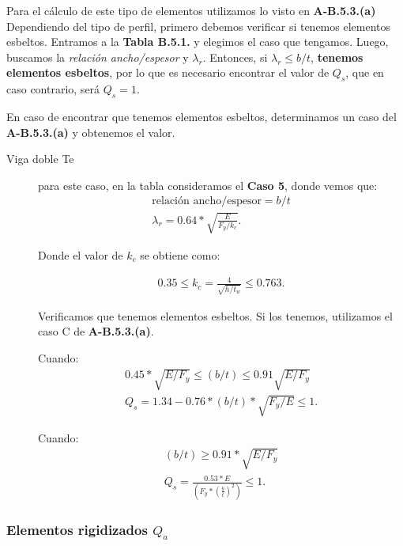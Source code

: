 \documentclass[../main.tex]{subfiles}
\begin{document}
Para el cálculo de este tipo de elementos utilizamos lo visto en \textbf{A-B.5.3.(a)}
Dependiendo del tipo de perfil, primero debemos verificar si tenemos elementos
esbeltos. Entramos a la \textbf{Tabla B.5.1.} y elegimos el caso que tengamos. 
Luego, buscamos la \textit{relación ancho/espesor} y $\lambda_r$. Entonces, si 
$\lambda_r \leq b/t$, \textbf{tenemos elementos esbeltos}, por lo que es
necesario encontrar el valor de $Q_s$, que en caso contrario, será  $Q_s=1$.

En caso de encontrar que tenemos elementos esbeltos, determinamos un caso del
\textbf{A-B.5.3.(a)} y obtenemos el valor.

\begin{description}
  \item[Viga doble Te] para este caso, en la tabla consideramos el \textbf{Caso 5}, donde vemos que:
    \begin{align*}    
      \text{relación ancho/espesor} =  b / t \\[5pt]
      \lambda_r = 0.64*\sqrt{\frac{E}{F_y / k_c}} 
    .\end{align*}

    Donde el valor de $k_c$ se obtiene como:

    \begin{align*}
      0.35 \leq k_c = \frac{4}{\sqrt{h / t_w}} \leq 0.763
    .\end{align*}

    Verificamos que tenemos elementos esbeltos. Si los tenemos, utilizamos el
    caso C de \textbf{A-B.5.3.(a)}. 
    
    Cuando:
    \begin{align*}
      0.45 * \sqrt{E / F_y} \leq (b/t) \leq 0.91 \sqrt{E / F_y}  \\[5pt]
      Q_s = 1.34 - 0.76*(b / t) * \sqrt{F_y / E} \leq 1 
    .\end{align*}

    Cuando:
    \begin{align*}
      (b / t) \geq 0.91 * \sqrt{E / F_y} \\[5pt] 
      Q_s = \frac{0.53 * E}{\left( F_y * \left(\frac{b}{t}  \right)^2  \right)} \leq 1 
    .\end{align*}
\end{description}

\subsubsection{Elementos rigidizados $Q_a$}
\end{document}
